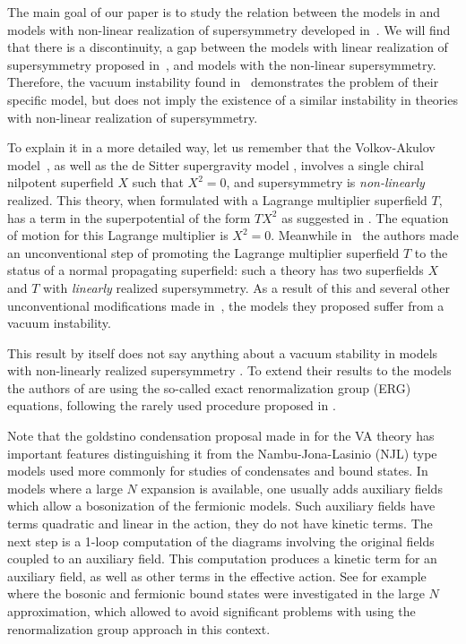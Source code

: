 \documentclass[11pt]{article}
\begin{document}
The main goal of our paper is to study the relation between the models in \cite{DallAgata:2022abm} and models with non-linear realization of supersymmetry developed in~\cite{Volkov:1973ix,Bergshoeff:2015tra,Hasegawa:2015bza}. We will find that there is a discontinuity, a gap between the models with linear realization of supersymmetry proposed in~\cite{DallAgata:2022abm}, and models with the non-linear supersymmetry. Therefore, the vacuum instability found in~\cite{DallAgata:2022abm} demonstrates the problem of their specific model, but does not imply the existence of a similar instability in theories with non-linear realization of supersymmetry.
 
 
To explain it in a more detailed way, let us remember that the Volkov-Akulov model~\cite{Volkov:1973ix}, as well as the  de Sitter supergravity model \cite{Bergshoeff:2015tra,Hasegawa:2015bza},  involves a single chiral nilpotent superfield $X$ such that $X^2=0$, and supersymmetry is {\it non-linearly} realized. This theory, when formulated with a Lagrange multiplier superfield $T$, has a term in the superpotential of the form $TX^2$ as suggested in \cite{Komargodski:2009rz}.
The equation of motion for this Lagrange multiplier is $X^2=0$.
Meanwhile in~\cite{DallAgata:2022abm} the authors made an unconventional step of promoting the  Lagrange multiplier superfield  $T$  to the status of a normal propagating superfield: such a theory has two superfields $X$ and $T$ with {\it linearly} realized supersymmetry. 
  As a result of this and several other unconventional modifications made in~\cite{DallAgata:2022abm}, the  models they proposed suffer  from a vacuum instability. 
  
  This result by itself does not say anything about a vacuum stability in models with non-linearly realized supersymmetry \cite{Volkov:1973ix,Bergshoeff:2015tra,Hasegawa:2015bza}. To extend their results to the models  \cite{Volkov:1973ix,Bergshoeff:2015tra,Hasegawa:2015bza} the authors of \cite{DallAgata:2022abm} are using   the so-called  exact renormalization group (ERG) equations, following the rarely used procedure proposed in \cite{Jaeckel:2002rm}.
    
  Note that the  goldstino condensation proposal made in \cite{DallAgata:2022abm} for the VA theory has important features distinguishing it from the Nambu-Jona-Lasinio (NJL) type models \cite{Nambu:1961tp, Nambu:1961fr} used more commonly for studies of  condensates and bound states. In models where a large $N$ expansion is available, one usually adds auxiliary fields  which allow a bosonization of the fermionic models. Such auxiliary fields have terms quadratic and linear in the action, they do not have kinetic terms. The next step is a 1-loop computation of the diagrams involving the original fields coupled to an auxiliary field. This computation produces a kinetic term  for an auxiliary field, as well as  other terms in the effective action. See for example \cite{Coleman:1974jh,Kobayashi:1975ev,Abbott:1975bn,Eguchi:1976iz,Linde:1976qh,Kirzhnits:1978fy,Bardeen:1989ds,Ebert:1994sm} where the bosonic and fermionic bound states were investigated in the large $N$ approximation, which allowed to avoid significant problems with using the renormalization group approach in this context.  
\end{document}
